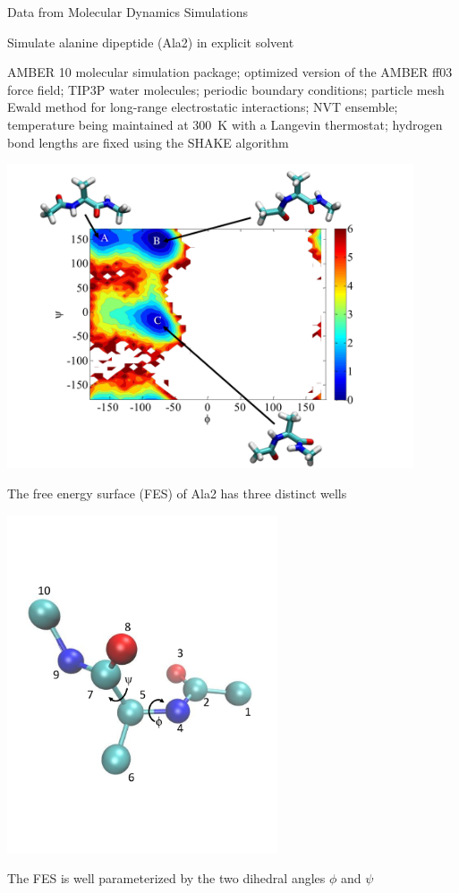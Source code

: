 \documentclass[12pt]{beamer}
\begin{document}
\begin{frame}{Data from Molecular Dynamics Simulations}

	Simulate alanine dipeptide (Ala2) in explicit solvent \\
	{\tiny AMBER 10 molecular simulation package;
    optimized version of the AMBER ff03 force field;
    TIP3P water molecules;
    periodic boundary conditions;
    particle mesh Ewald method for long-range electrostatic interactions;
    NVT ensemble;
    temperature being maintained at 300~K with a Langevin thermostat;
    hydrogen bond lengths are fixed using the SHAKE algorithm \par}

    \begin{minipage}[b]{0.5\textwidth}
        \centering
        \includegraphics[width=0.9\textwidth]{FES}\\
        {\footnotesize The free energy surface (FES) of Ala2 has three distinct wells \par}
    \end{minipage}
    \hfill
    \begin{minipage}[b]{0.4\textwidth}
        \centering
        \includegraphics[width=0.6\textwidth]{molecule2}\\
        {\footnotesize The FES is well parameterized by the two dihedral angles $\phi$ and $\psi$ \par}
    \end{minipage}


\end{frame}
\end{document}
